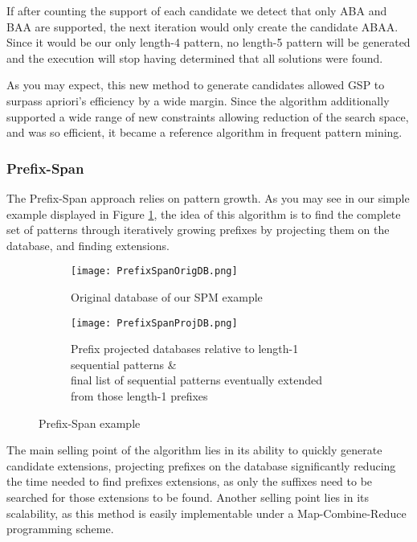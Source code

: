 \documentclass{eplmastersthesis}
\begin{document}
If after counting the support of each candidate we detect that only ABA and BAA are supported, the next iteration would only create the candidate ABAA. Since it would be our only length-4 pattern, no length-5 pattern will be generated and the execution will stop having determined that all solutions were found. \newline

As you may expect, this new method to generate candidates allowed GSP to surpass apriori's efficiency by a wide margin. Since the algorithm additionally supported a wide range of new constraints allowing reduction of the search space, and was so efficient, it became a reference algorithm in frequent pattern mining.

\subsubsection{Prefix-Span}

The Prefix-Span approach \cite{pei2004mining, han2001prefixspan} relies on pattern growth. As you may see in our simple example displayed in Figure \ref{ex:PrefixSpanExample}, the idea of this algorithm is to find the complete set of patterns through iteratively growing prefixes by projecting them on the database, and finding extensions. \newline

\begin{figure}[h]
  \centering
  \begin{subfigure}{\textwidth}
  	\centering
    \texttt{[image: PrefixSpanOrigDB.png]}
    \caption{Original database of our SPM example}
  \end{subfigure}
  \begin{subfigure}{\textwidth}
  	\centering
    \texttt{[image: PrefixSpanProjDB.png]}
    \caption[Prefix projected database \& sequential pattern]{
			Prefix projected databases relative to length-1 sequential patterns \& \\
			final list of sequential patterns eventually extended from those length-1 prefixes
		\endtabular
	}
  \end{subfigure}
  \caption{Prefix-Span example}
  \label{ex:PrefixSpanExample}
\end{figure}

The main selling point of the algorithm lies in its ability to quickly generate candidate extensions, projecting prefixes on the database significantly reducing the time needed to find prefixes extensions, as only the suffixes need to be searched for those extensions to be found. Another selling point lies in its scalability, as this method is easily implementable under a Map-Combine-Reduce programming scheme. \newline
\end{document}
